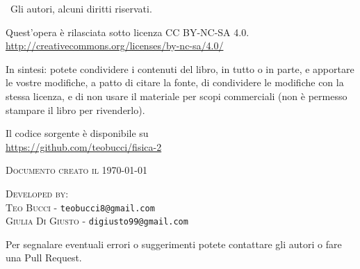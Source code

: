 
\textcopyright \ Gli autori, alcuni diritti riservati.

Quest'opera è rilasciata sotto licenza CC BY-NC-SA 4.0.\\
\url{http://creativecommons.org/licenses/by-nc-sa/4.0/}

In sintesi: potete condividere i contenuti del libro, in tutto o in parte, e apportare le vostre modifiche, a patto di citare la fonte, di condividere le modifiche con la stessa licenza, e di non usare il materiale per scopi commerciali (non è permesso stampare il libro per rivenderlo).

Il codice sorgente \latex è disponibile su \\
\url{https://github.com/teobucci/fisica-2}


\textsc{Documento creato il \today}


\textsc{Developed by:}\\
\textsc{Teo Bucci} - \texttt{teobucci8@gmail.com}\\
\textsc{Giulia Di Giusto} - \texttt{digiusto99@gmail.com}

Per segnalare eventuali errori o suggerimenti potete contattare gli autori o fare una Pull Request.

